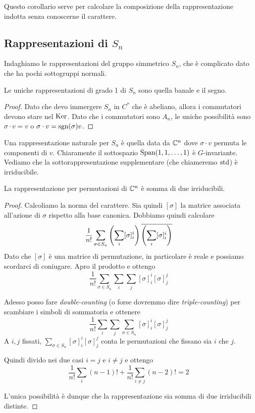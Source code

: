 		Questo corollario serve per calcolare la composizione della rappresentazione indotta senza conoscerne il carattere.
		

	
	\subsection{Rappresentazioni di $S_n$}
		Indaghiamo le rappresentazioni del gruppo simmetrico $S_n$, che è complicato dato che ha pochi sottogruppi normali.
		
		\begin{myprop}
		Le uniche rappresentazioni di grado 1 di $S_n$ sono quella banale e il segno.
		\end{myprop}
		\begin{proof}
		Dato che devo immergere $S_n$ in $C^*$ che è abeliano, allora i commutatori devono stare nel $\operatorname{Ker}$. Dato che i commutatori sono $A_n$, le uniche possibilità sono $\sigma \cdot v = v$ o $\sigma \cdot v=\operatorname{sgn}(\sigma)v$.
		\end{proof}
		
		Una rappresentazione naturale per $S_n$ è quella data da $\mathbb C^n$ dove $\sigma \cdot v$ permuta le componenti di $v$. Chiaramente il sottospazio $\operatorname{Span}(1,1,\dots,1)$ è $G$-invariante. Vediamo che la sottorappresentazione supplementare (che chiameremo $\operatorname{std}$) è irriducibile.
		
		\begin{myprop}
		La rappresentazione per permutazioni di $\mathbb C^n$ è somma di due irriducibili.
		\end{myprop}
		\begin{proof}
		Calcoliamo la norma del carattere. Sia quindi $[\sigma]$ la matrice associata all'azione di $\sigma$ rispetto alla base canonica.
		Dobbiamo quindi calcolare
		\[
			\frac1{n!}\sum_{\sigma\in S_n} \left(\sum_i [\sigma]_i^i\right)\overline{\left(\sum_i[\sigma]_i^i\right)}
		\]
		Dato che $[\sigma]$ è una matrice di permutazione, in particolare è reale e possiamo scordarci di coniugare. Apro il prodotto e ottengo
		\[
			\frac1{n!}\sum_{\sigma\in S_n} \sum_i \sum_j [\sigma]_i^i[\sigma]_j^j
		\]
		
		Adesso posso fare \emph{double-counting} (o forse dovremmo dire \emph{triple-counting}) per scambiare i simboli di sommatoria e ottenere
		\[
			\frac1{n!}\sum_i \sum_j\sum_{\sigma\in S_n} [\sigma]_i^i[\sigma]_j^j      
		\]
		A $i,j$ fissati, $\sum_{\sigma\in S_n} [\sigma]_i^i[\sigma]_j^j$ conta le permutazioni che fissano sia $i$ che $j$.
		
		Quindi divido nei due casi $i=j$ e $i\ne j$ e ottengo
		\[
			\frac1{n!}\sum_i (n-1)! +  \frac1{n!}\sum_{i\ne j} (n-2)! = 2
		\]
		
		L'unica possibilità è dunque che la rappresentazione sia somma di due irriducibili distinte.
		\end{proof}
	





